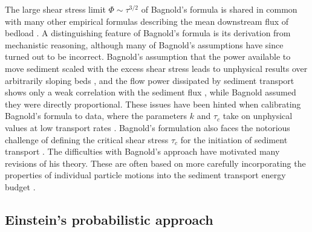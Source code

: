 The large shear stress limit $\Phi \sim \tau^{3/2}$ of Bagnold's formula is shared in common with many other empirical formulas describing the mean downstream flux of bedload \citep[e.g.][]{MeyerPeter1948, Yalin1972, Wilcock2003, Parker1990}. A distinguishing feature of Bagnold's formula is its derivation from mechanistic reasoning, although many of Bagnold's assumptions have since turned out to be incorrect.
Bagnold's assumption that the power available to move sediment scaled with the excess shear stress leads to unphysical results over arbitrarily sloping beds \citep{Seminara2002}, and the flow power dissipated by sediment transport shows only a weak correlation with the sediment flux \citep{Ancey2008}, while Bagnold assumed they were directly proportional. These issues have been hinted when calibrating Bagnold's formula to data, where the parameters $k$ and $\tau_c$ take on unphysical values at low transport rates \citep{Nino1996}.
Bagnold's formulation also faces the notorious challenge of defining the critical shear stress $\tau_c$ for the initiation of sediment transport \citep{Paintal1971,Kirchener1990,Houssais2015,Clark2017,Allen2018}.
The difficulties with Bagnold's approach have motivated many revisions of his theory.
These are often based on more carefully incorporating the properties of individual particle motions into the sediment transport energy budget \citep{Engelund1976,Luque1976,Nino1998,Martin2000}.

\subsection{Einstein's probabilistic approach}
\label{sec:einflux}

